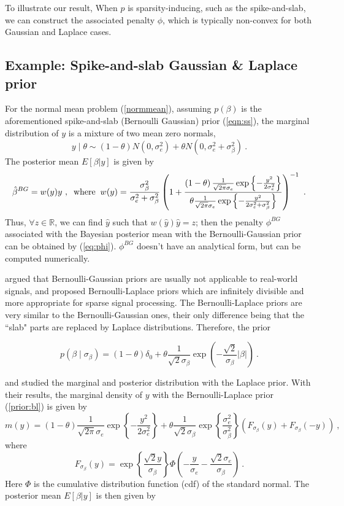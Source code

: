 \documentclass[11pt]{article}%
\numberwithin{equation}{section}
\theoremstyle{plain}
\begin{document}
To illustrate our result, When $p$ is sparsity-inducing, such as the spike-and-slab, we can construct the associated penalty $\phi$, which is typically non-convex for both Gaussian and Laplace cases.

\subsection{Example: Spike-and-slab Gaussian \& Laplace prior}

For the normal mean problem (\ref{normmean}), assuming $p\left(\beta\right)$ is the aforementioned spike-and-slab (Bernoulli Gaussian) prior (\ref{eqn:ss}), the marginal distribution of $y$ is a mixture of two mean zero normals,
$$
\left.y\mid\theta\right. \sim \left(1 - \theta\right) N\left(0, \sigma_e^2\right) + \theta N\left(0, \sigma_e^2 + \sigma_\beta^2\right) \ .
$$
The posterior mean $E\left[\beta | y\right]$ is given by
$$
\hat\beta^{BG} = w(y) y \ , \; \; {\rm where} \; \; w(y) =   \frac{\sigma_\beta^2 }{\sigma_e^2 + \sigma_\beta^2} 
\left(1 + 
\frac{
\left(1-\theta\right) \frac{1}{\sqrt{2\pi}\sigma_e}\exp\left\{-\frac{y^2}{2\sigma_e^2}\right\}
}
{
\theta \frac{1}{\sqrt{2\pi}\sigma_e}\exp\left\{-\frac{y^2}{2\sigma_e^2 + \sigma_\beta^2}\right\}
}
\right)^{-1} \ .
$$
Thus, $\forall z\in \mathbb{R}$, we can find $\hat y$ such that $w\left(\hat y\right)\hat y = z$; then the penalty $\phi^{BG}$ associated with the Bayesian posterior mean with the Bernoulli-Gaussian prior can be obtained by (\ref{eq:phi}).  $\phi^{BG}$ doesn't have an analytical form, but can be computed numerically.

\cite{amini2012} argued that Bernoulli-Gaussian priors are usually not applicable to real-world signals, and proposed Bernoulli-Laplace priors which are infinitely divisible and more appropriate for sparse signal processing.  The Bernoulli-Laplace priors are very similar to the Bernoulli-Gaussian ones, their only difference being that the ``slab" parts are replaced by Laplace distributions.  Therefore, the prior

\begin{equation}
\label{prior:bl}
p\left(\beta\mid\sigma_\beta\right) = \left(1-\theta\right)\delta_0 + \theta \frac{1}{\sqrt{2}\sigma_\beta}\exp\left(-\frac{\sqrt{2}}{\sigma_\beta}\left|\beta\right|\right) \ .
\end{equation}

\cite{mitchell1994} and \cite{hans2009} studied the marginal and posterior distribution with the Laplace prior.  With their results, the marginal density of $y$ with the Bernoulli-Laplace prior (\ref{prior:bl}) is given by
$$
m\left(y\right) = \left(1-\theta\right) \frac{1}{\sqrt{2\pi}\sigma_e}\exp\left\{-\frac{y^2}{2\sigma_e^2}\right\} + \theta
\frac{1}{\sqrt{2}\sigma_\beta}
\exp\left\{\frac{\sigma_e^2}{\sigma_\beta^2}\right\}
\left(F_{\sigma_\beta}\left(y\right) + 
F_{\sigma_\beta}\left(-y\right)\right) \ ,
$$
where
$$
F_{\sigma_\beta}\left(y\right) = 
\exp\left\{\frac{\sqrt{2}y} {\sigma_\beta}\right\}
\Phi\left(
-\frac{y}{\sigma_e}
-\frac{\sqrt{2}\sigma_e}{\sigma_\beta}
\right) \ .
$$
Here $\Phi$ is the cumulative distribution function (cdf) of the standard normal.  The posterior mean $E\left[\beta | y\right]$ is then given by
\end{document}
